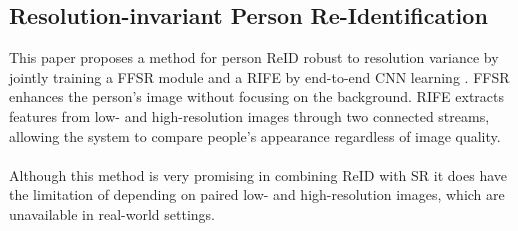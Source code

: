 \subsection{Resolution-invariant Person Re-Identification}

This paper proposes a method for person \ac{ReID} robust to resolution variance by jointly training a \ac{FFSR} module and a \ac{RIFE} by end-to-end \ac{CNN} learning \cite{FFSR}. \ac{FFSR} enhances the person’s image without focusing on the background. \ac{RIFE} extracts features from low- and high-resolution images through two connected streams, allowing the system to compare people’s appearance regardless of image quality. 
\\\\
Although this method is very promising in combining \ac{ReID} with \ac{SR} it does have the limitation of depending on paired low- and high-resolution images, which are unavailable in real-world settings. 
